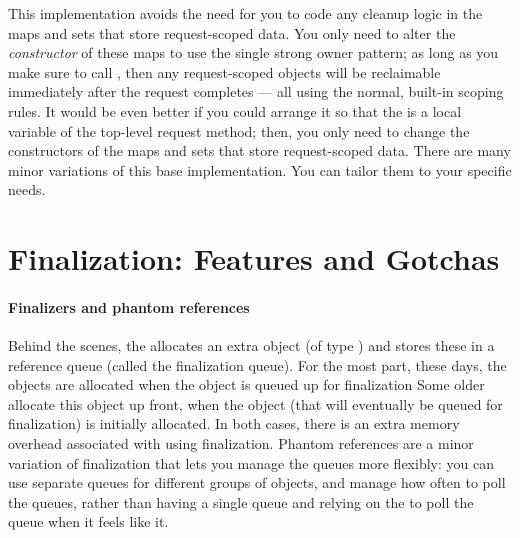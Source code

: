 This implementation avoids the need for you to code any cleanup logic in the maps
and sets that store request-scoped data. You only need to alter the
\emph{constructor} of these maps to use the single strong owner pattern; as long
as you make sure to call , then any request-scoped
objects will be reclaimable immediately after the request completes --- all using
the normal, built-in scoping rules. It would be even better if you could arrange
it so that the  is a local variable of the
top-level request method; then, you only need to change the constructors of the
maps and sets that store request-scoped data. There are many minor variations of
this base implementation. You can tailor them to your specific needs.

\section{Finalization: Features and Gotchas}

\paragraph{Finalizers and phantom references}

Behind the scenes,
the \jre allocates an extra object (of type
) and stores these in a reference queue
(called the finalization queue). For the most part, these days, the
 objects are allocated when the object is queued up for
finalization Some older \jres allocate this object up front, when the object
(that will eventually be queued for finalization) is initially allocated. In
both cases, there is an extra memory overhead associated with using
finalization. Phantom references are a minor variation of finalization that lets
you manage the queues more flexibly: you can use separate queues for different
groups of objects, and manage how often to poll the queues, rather than having a
single queue and relying on the \jre to poll the queue when it feels like
it.

